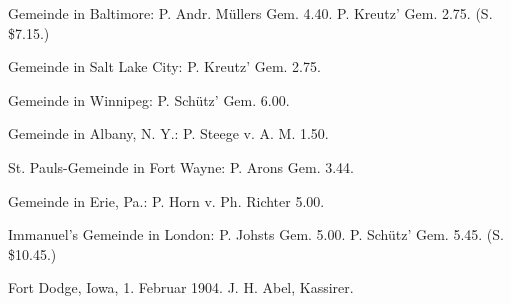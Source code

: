 Gemeinde in Baltimore: P. Andr. Müllers Gem. 4.40. P. Kreutz’ Gem. 2.75. (S. \$7.15.)

Gemeinde in Salt Lake City: P. Kreutz’ Gem. 2.75.

Gemeinde in Winnipeg: P. Schütz’ Gem. 6.00.

Gemeinde in Albany, N. Y.: P. Steege v. A. M. 1.50.

St. Pauls-Gemeinde in Fort Wayne: P. Arons Gem. 3.44.

Gemeinde in Erie, Pa.: P. Horn v. Ph. Richter 5.00.

Immanuel’s Gemeinde in London: P. Johsts Gem. 5.00. P. Schütz’ Gem. 5.45. (S. \$10.45.)

Fort Dodge, Iowa, 1. Februar 1904. J. H. Abel, Kassirer.
